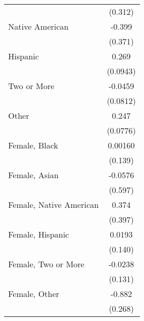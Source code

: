 \documentclass[9pt]{extarticle}
\begin{document}
{\begin{longtable}[l]{l*{1}{c}}
                                                  &                  (0.312)         \\
[0.3em]
Native American                        			  &                   -0.399         \\
                                                  &                  (0.371)         \\
[0.3em]
Hispanic                                		  &                    0.269\sym{**} \\
                                                  &                 (0.0943)         \\
[0.3em]
Two or More                             		  &                  -0.0459         \\
                                                  &                 (0.0812)         \\
[0.3em]
Other                                   		  &                    0.247\sym{**} \\
                                                  &                 (0.0776)         \\
[0.3em]
Female, Black                           		  &                  0.00160         \\
                                                  &                  (0.139)         \\
[0.3em]
Female, Asian                           		  &                  -0.0576         \\
                                                  &                  (0.597)         \\
[0.3em]
Female, Native American                 		  &                    0.374         \\
                                                  &                  (0.397)         \\
[0.3em]
Female, Hispanic		                          &                   0.0193         \\
                                                  &                  (0.140)         \\
[0.3em]
Female, Two or More            			          &                  -0.0238         \\
                                                  &                  (0.131)         \\
[0.3em]
Female, Other                     			      &                   -0.882\sym{**} \\
                                                  &                  (0.268)         \\

\end{longtable}}
\end{document}
